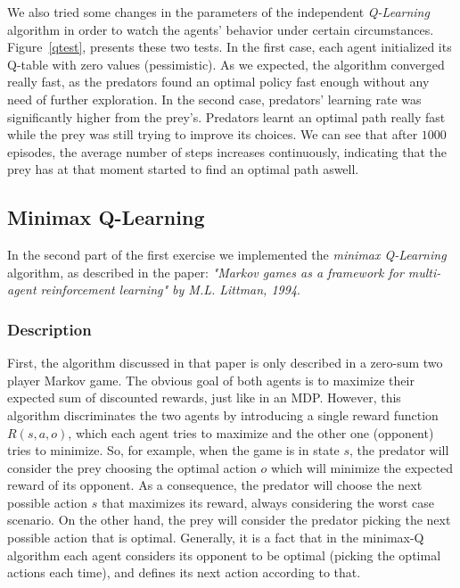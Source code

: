 \documentclass[a4paper,11pt]{article}
\begin{document}
We also tried some changes in the parameters of the independent \textit{Q-Learning} algorithm in order to watch the agents' behavior under certain circumstances. Figure~\ref{qtest}, presents these two tests. In the first case, each agent initialized its Q-table with zero values (pessimistic). As we expected, the algorithm converged really fast, as the predators found an optimal policy fast enough without any need of further exploration. In the second case, predators' learning rate was significantly higher from the prey's. Predators learnt an optimal path really fast while the prey was still trying to improve its choices. We can see that after $1000$ episodes, the average number of steps increases continuously, indicating that the prey has at that moment started to find an optimal path aswell.


\subsection{Minimax Q-Learning}

In the second part of the first exercise we implemented the \textit{minimax Q-Learning} algorithm, as described in the paper: \textit{"Markov games as a framework for multi-agent reinforcement learning" by M.L. Littman, 1994}.

\subsubsection{Description}
First, the algorithm discussed in that paper is only described in a zero-sum two player Markov game. The obvious goal of both agents is to maximize their expected sum of discounted rewards, just like in an MDP. However, this algorithm discriminates the two agents by introducing a single reward function $R(s,a,o)$, which each agent tries to maximize and the other one (opponent) tries to minimize. So, for example, when the game is in state $s$, the predator will consider the prey choosing the optimal action $o$ which will minimize the expected reward of its opponent. As a consequence, the predator will choose the next possible action $s$ that maximizes its reward, always considering the worst case scenario. On the other hand, the prey will consider the predator picking the next possible action that is optimal. Generally, it is a fact that in the minimax-Q algorithm each agent considers its opponent to be optimal (picking the optimal actions each time), and defines its next action according to that. 
\end{document}
